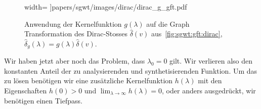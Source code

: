 \begin{figure}
\begin{minipage}[t]{0.49\textwidth}
        width=\textwidth
        ]{papers/sgwt/images/dirac/dirac_g_gft.pdf}
        \vspace{-20pt}
        \caption{Anwendung der Kernelfunktion $g(\lambda)$ auf die Graph 
            Transformation des Dirac-Stosses $\hat{\delta}(v)$ 
            aus~\cref{fig:sgwt:gft:dirac},
            $\hat{\delta}_g(\lambda) = g(\lambda)\hat{\delta}(v)$.
            \label{fig:sgwt:gft:ggft}}
    \end{minipage}
\end{figure}

Wir haben jetzt aber noch das Problem, dass $\lambda_0 = 0$ gilt. Wir verlieren 
also den konstanten Anteil der zu analysierenden und synthetisierenden 
Funktion. Um das zu l\"osen ben\"otigen wir eine zus\"atzliche 
Kernelfunktion $h(\lambda)$ mit den Eigenschaften $h(0) > 0$ und 
$\lim_{\lambda\to\infty} h(\lambda) = 0$, oder anders ausgedr\"uckt, wir 
ben\"otigen einen Tiefpass.

